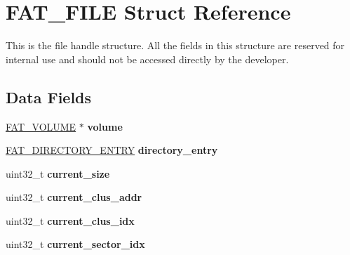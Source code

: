 \hypertarget{struct_f_a_t___f_i_l_e}{\section{F\-A\-T\-\_\-\-F\-I\-L\-E Struct Reference}
\label{struct_f_a_t___f_i_l_e}
}


This is the file handle structure. All the fields in this structure are reserved for internal use and should not be accessed directly by the developer.  


\subsection*{Data Fields}
\begin{DoxyCompactItemize}
\item 
\hypertarget{struct_f_a_t___f_i_l_e_a83eac8bd6f2e96d7a868bdd545a6e36a}{\hyperlink{struct_f_a_t___v_o_l_u_m_e}{F\-A\-T\-\_\-\-V\-O\-L\-U\-M\-E} $\ast$ {\bfseries volume}}\label{struct_f_a_t___f_i_l_e_a83eac8bd6f2e96d7a868bdd545a6e36a}

\item 
\hypertarget{struct_f_a_t___f_i_l_e_aa67dd2410d012e56dd2ad82ddcf4c415}{\hyperlink{struct_f_a_t___d_i_r_e_c_t_o_r_y___e_n_t_r_y}{F\-A\-T\-\_\-\-D\-I\-R\-E\-C\-T\-O\-R\-Y\-\_\-\-E\-N\-T\-R\-Y} {\bfseries directory\-\_\-entry}}\label{struct_f_a_t___f_i_l_e_aa67dd2410d012e56dd2ad82ddcf4c415}

\item 
\hypertarget{struct_f_a_t___f_i_l_e_ab4e668c5972a21211c5f440f3d25b289}{uint32\-\_\-t {\bfseries current\-\_\-size}}\label{struct_f_a_t___f_i_l_e_ab4e668c5972a21211c5f440f3d25b289}

\item 
\hypertarget{struct_f_a_t___f_i_l_e_aa40d3540a6bc01c0db0d5652eb54c9da}{uint32\-\_\-t {\bfseries current\-\_\-clus\-\_\-addr}}\label{struct_f_a_t___f_i_l_e_aa40d3540a6bc01c0db0d5652eb54c9da}

\item 
\hypertarget{struct_f_a_t___f_i_l_e_a7f6cee3460fa0695257b3c1423f78dd2}{uint32\-\_\-t {\bfseries current\-\_\-clus\-\_\-idx}}\label{struct_f_a_t___f_i_l_e_a7f6cee3460fa0695257b3c1423f78dd2}

\item 
\hypertarget{struct_f_a_t___f_i_l_e_a253e49b3ed2a66e7e954fd24a98c23d0}{uint32\-\_\-t {\bfseries current\-\_\-sector\-\_\-idx}}\label{struct_f_a_t___f_i_l_e_a253e49b3ed2a66e7e954fd24a98c23d0}


\end{DoxyCompactItemize}
